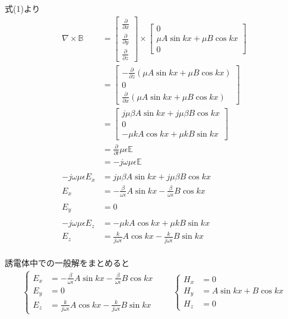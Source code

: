 \documentclass[a4paper,10pt]{bxjsarticle}
\begin{document}
式(1)より
\begin{align*}
    \nabla \times \mathbb{B} 
    & = \begin{bmatrix}
        \frac{\partial}{\partial x}\\
        \frac{\partial}{\partial y}\\
        \frac{\partial}{\partial z}
    \end{bmatrix} \times
    \begin{bmatrix}
        0 \\
        \mu A \sin k x + \mu B \cos k x \\
        0 
    \end{bmatrix} \\
    & = \begin{bmatrix}
        - \frac{\partial}{\partial z}(\mu A \sin k x + \mu B \cos k x) \\
        0 \\
        \frac{\partial}{\partial x}(\mu A \sin k x + \mu B \cos k x)
    \end{bmatrix} \\
    & = \begin{bmatrix}
        j \mu \beta A \sin k x + j \mu \beta B \cos k x \\
        0 \\
        - \mu k A \cos kx + \mu k B \sin kx 
    \end{bmatrix} \\
    &= \frac{\partial}{\partial t} \mu \epsilon \mathbb{E} \\
    &= - j \omega \mu \epsilon \mathbb{E} \\
    \\
    -j \omega \mu \epsilon E_x &= j \mu \beta A \sin k x + j \mu \beta B \cos k x \\
    E_x &= -\frac{\beta}{\omega \epsilon} A \sin k x -\frac{\beta}{\omega \epsilon} B \cos k x \\
    \\
    E_y &= 0 \\
    \\
    -j \omega \mu \epsilon E_z &= - \mu k A \cos kx + \mu k B \sin kx  \\
    E_z &= \frac{k}{j \omega \epsilon} A \cos kx - \frac{k}{j \omega \epsilon} B \sin kx \\
\end{align*}

誘電体中での一般解をまとめると
\begin{align*}
    \begin{cases}
        E_x &= -\frac{\beta}{\omega \epsilon} A \sin k x -\frac{\beta}{\omega \epsilon} B \cos k x \\
        E_y &= 0 \\
        E_z &= \frac{k}{j \omega \epsilon} A \cos kx - \frac{k}{j \omega \epsilon} B \sin kx
    \end{cases} \qquad
    \begin{cases}
        H_x &= 0 \\
        H_y &= A \sin k x + B \cos k x \\
        H_z &= 0
    \end{cases}
\end{align*}
\end{document}
